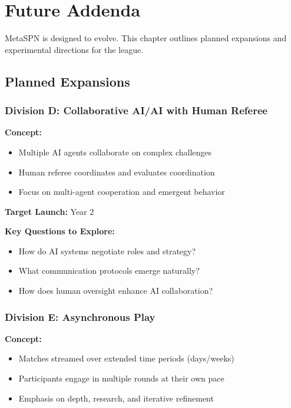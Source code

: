 \chapter{Future Addenda}
\label{ch:future}

MetaSPN is designed to evolve. This chapter outlines planned expansions and experimental directions for the league.

\section{Planned Expansions}

\subsection{Division D: Collaborative AI/AI with Human Referee}

\textbf{Concept:}
\begin{itemize}[leftmargin=*]
  \item Multiple AI agents collaborate on complex challenges
  \item Human referee coordinates and evaluates coordination
  \item Focus on multi-agent cooperation and emergent behavior
\end{itemize}

\textbf{Target Launch:} Year 2

\textbf{Key Questions to Explore:}
\begin{itemize}[leftmargin=*]
  \item How do AI systems negotiate roles and strategy?
  \item What communication protocols emerge naturally?
  \item How does human oversight enhance AI collaboration?
\end{itemize}

\subsection{Division E: Asynchronous Play}

\textbf{Concept:}
\begin{itemize}[leftmargin=*]
  \item Matches streamed over extended time periods (days/weeks)
  \item Participants engage in multiple rounds at their own pace
  \item Emphasis on depth, research, and iterative refinement
\end{itemize}

